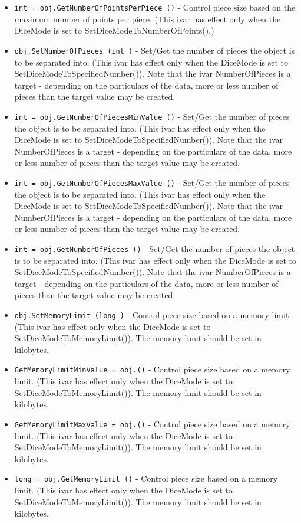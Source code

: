 \begin{itemize}
\item  \verb|int = obj.GetNumberOfPointsPerPiece ()| -  Control piece size based on the maximum number of points per piece.
 (This ivar has effect only when the DiceMode is set to 
 SetDiceModeToNumberOfPoints().)

\item  \verb|obj.SetNumberOfPieces (int )| -  Set/Get the number of pieces the object is to be separated into.
 (This ivar has effect only when the DiceMode is set to
 SetDiceModeToSpecifiedNumber()). Note that the ivar
 NumberOfPieces is a target - depending on the particulars of the
 data, more or less number of pieces than the target value may be
 created.

\item  \verb|int = obj.GetNumberOfPiecesMinValue ()| -  Set/Get the number of pieces the object is to be separated into.
 (This ivar has effect only when the DiceMode is set to
 SetDiceModeToSpecifiedNumber()). Note that the ivar
 NumberOfPieces is a target - depending on the particulars of the
 data, more or less number of pieces than the target value may be
 created.

\item  \verb|int = obj.GetNumberOfPiecesMaxValue ()| -  Set/Get the number of pieces the object is to be separated into.
 (This ivar has effect only when the DiceMode is set to
 SetDiceModeToSpecifiedNumber()). Note that the ivar
 NumberOfPieces is a target - depending on the particulars of the
 data, more or less number of pieces than the target value may be
 created.

\item  \verb|int = obj.GetNumberOfPieces ()| -  Set/Get the number of pieces the object is to be separated into.
 (This ivar has effect only when the DiceMode is set to
 SetDiceModeToSpecifiedNumber()). Note that the ivar
 NumberOfPieces is a target - depending on the particulars of the
 data, more or less number of pieces than the target value may be
 created.

\item  \verb|obj.SetMemoryLimit (long )| -  Control piece size based on a memory limit.  (This ivar has
 effect only when the DiceMode is set to
 SetDiceModeToMemoryLimit()). The memory limit should be set in
 kilobytes.

\item  \verb|GetMemoryLimitMinValue = obj.()| -  Control piece size based on a memory limit.  (This ivar has
 effect only when the DiceMode is set to
 SetDiceModeToMemoryLimit()). The memory limit should be set in
 kilobytes.

\item  \verb|GetMemoryLimitMaxValue = obj.()| -  Control piece size based on a memory limit.  (This ivar has
 effect only when the DiceMode is set to
 SetDiceModeToMemoryLimit()). The memory limit should be set in
 kilobytes.

\item  \verb|long = obj.GetMemoryLimit ()| -  Control piece size based on a memory limit.  (This ivar has
 effect only when the DiceMode is set to
 SetDiceModeToMemoryLimit()). The memory limit should be set in
 kilobytes.

\end{itemize}
